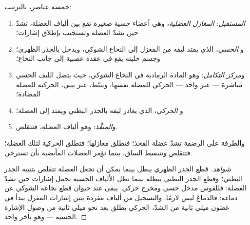 \begin{proposition}\label{prop:g12:stretch-reflex:arc}
خمسة عناصر، بالترتيب:
\begin{enumerate}
  \item \emph{المستقبل}: \emph{المغازل العضلية}، وهي أعضاء حسية صغيرة
        تقع بين ألياف العضلة، تشدّ حين تشدّ العضلة وتستجيب بإطلاق
        إشارات؛
  \item و\emph{ الحسي}، الذي يمتد ليفه من المغزل إلى النخاع
        الشوكي، ويدخل بالجذر الظهري؛ وجسم خليته يقع في عقدة عصبية إلى
        جانب النخاع؛
  \item و\emph{مركز التكامل}: وهو المادة الرمادية في النخاع الشوكي،
        حيث يتصل الليف الحسي مباشرة --- عبر  واحد --- 
        الحركي للعضلة نفسها، ويثبّط، عبر  بيني،  الحركية
        للعضلة المضادة؛
  \item و\emph{ الحركي}، الذي يغادر ليفه بالجذر البطني ويمتد
        إلى العضلة؛
  \item و\emph{المنفِّذ}: وهو ألياف العضلة، فتتقلص.
\end{enumerate}
والطرقة على  الرضفة تشدّ عضلة الفخذ؛ فتطلق مغازلها؛ فتطلق 
الحركية لتلك العضلة؛ فتتقلص وتنبسط الساق، بينما تؤمر العضلات المأبضية
بأن تسترخي.
\end{proposition}
\begin{proof}[شواهد]
قطع الجذر الظهري يبطل  بينما يمكن أن تجعل العضلة تتقلص بتنبيه
الجذر البطني؛ وقطع الجذر البطني يبطله بينما تظل الألياف الحسية تحمل
إشارات حين تشدّ العضلة: فللقوس مدخل حسي ومخرج حركي.  يبقى عند
حيوان قطع نخاعه الشوكي عن دماغه: فالدماغ ليس لازمًا. والتسجيل من ألياف
مفردة يبين إشارات المغزل تبدأ في غضون ميلي ثانية من الشدّ، 
الحركي يطلق بعد نحو ميلي ثانية من وصول الإشارة الحسية --- وهو تأخر
 واحد.
\end{proof}

